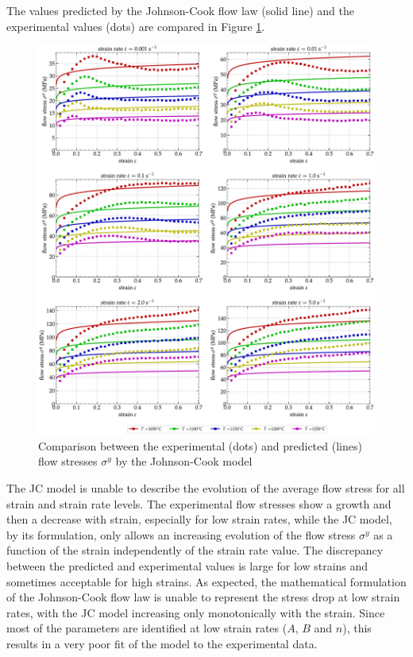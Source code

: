 \documentclass[metals,article,submit,pdftex,moreauthors]{Definitions/mdpi}
\begin{document}
The values predicted by the Johnson-Cook flow law (solid line) and the experimental values (dots) are compared in Figure \ref{fig:CompExp-JC-6}.
\begin{figure}[!ht]
\centering
\includegraphics[width=\columnwidth]{Figures/CompExp-JC-6}
\caption{Comparison between the experimental (dots) and predicted (lines) flow stresses $\sigma^y$ by the Johnson-Cook model}
\label{fig:CompExp-JC-6}
\end{figure}
The JC model is unable to describe the evolution of the average flow stress for all strain and strain rate levels. The experimental flow stresses show a growth and then a decrease with strain, especially for low strain rates, while the JC model, by its formulation, only allows an increasing evolution of the flow stress $\sigma^y$ as a function of the strain independently of the strain rate value.
The discrepancy between the predicted and experimental values is large for low strains and sometimes acceptable for high strains.
As expected, the mathematical formulation of the Johnson-Cook flow law is unable to represent the stress drop at low strain rates, with the JC model increasing only monotonically with the strain.
Since most of the parameters are identified at low strain rates ($A$, $B$ and $n$), this results in a very poor fit of the model to the experimental data.
\end{document}
